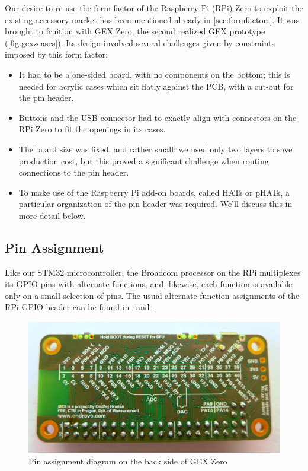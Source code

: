 Our desire to re-use the form factor of the Raspberry Pi (RPi) Zero to exploit the existing accessory market has been mentioned already in \cref{sec:formfactors}. It was brought to fruition with GEX Zero, the second realized GEX prototype (\cref{fig:gexzcases}). Its design involved several challenges given by constraints imposed by this form factor:

\begin{itemize}
	\item It had to be a one-sided board, with no components on the bottom; this is needed for acrylic cases which sit flatly against the \gls{PCB}, with a cut-out for the pin header.
	\item Buttons and the USB connector had to exactly align with connectors on the RPi Zero to fit the openings in its cases.
	\item The board size was fixed, and rather small; we used only two layers to save production cost, but this proved a significant challenge when routing connections to the pin header.
	\item To make use of the Raspberry Pi add-on boards, called HATs or pHATs, a particular organization of the pin header was required. We'll discuss this in more detail below.
\end{itemize}

\subsection{Pin Assignment}

Like our STM32 microcontroller, the Broadcom processor on the RPi multiplexes its \gls{GPIO} pins with alternate functions, and, likewise, each function is available only on a small selection of pins. The usual alternate function assignments of the RPi \gls{GPIO} header can be found in~\cite{piheader} and~\cite{piheaderxyz}.

\begin{figure}[h]
	\centering
	\includegraphics[width=.85\textwidth]{img/photo-zero-naked-bottom.jpg}
	\caption[GEX Zero back side]{\label{fig:gexz}Pin assignment diagram on the back side of GEX Zero}
\end{figure}

